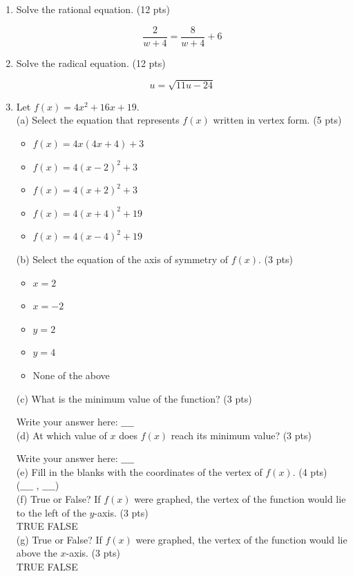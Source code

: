 \documentclass{ximera}
\begin{document}
\begin{enumerate}
Write your answer here: $k=$ $\_\_\_\_$\\
(c) Suppose the billiards player were to strike a marble with mass $M=7$ grams with the same amount of force. What would be the marble's acceleration? (3 pts)

Write your answer here: $a=$ $\_\_\_\_$

\item Solve the rational equation. (12 pts)

$$\frac{2}{w+4}=\frac{8}{w+4}+6$$

\item Solve the radical equation. (12 pts)

$$u=\sqrt{11 u-24}$$

\item Let $f(x)=4 x^{2}+16 x+19$.\\
(a) Select the equation that represents $f(x)$ written in vertex form. (5 pts)\\
\begin{itemize}
\item $f(x)=4 x(4 x+4)+3$
\item $f(x)=4(x-2)^{2}+3$
\item $f(x)=4(x+2)^{2}+3$
\item $f(x)=4(x+4)^{2}+19$
\item $f(x)=4(x-4)^{2}+19$
\end{itemize}
(b) Select the equation of the axis of symmetry of $f(x)$. (3 pts)\\
\begin{itemize}
\item $x=2$
\item $x=-2$
\item $y=2$
\item $y=4$
\item None of the above
\end{itemize}
(c) What is the minimum value of the function? (3 pts)

Write your answer here: $\_\_\_\_$\\
(d) At which value of $x$ does $f(x)$ reach its minimum value? (3 pts)

Write your answer here: $\_\_\_\_$\\
(e) Fill in the blanks with the coordinates of the vertex of $f(x)$. (4 pts)\\
($\_\_\_\_$ , $\_\_\_\_$)\\
(f) True or False? If $f(x)$ were graphed, the vertex of the function would lie to the left of the $y$-axis. (3 pts)\\
TRUE \quad FALSE\\
(g) True or False? If $f(x)$ were graphed, the vertex of the function would lie above the $x$-axis. (3 pts)\\
TRUE \quad FALSE

\end{enumerate}
\end{document}
